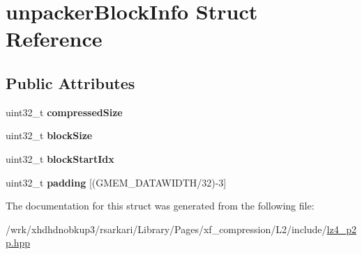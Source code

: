 \hypertarget{structunpackerBlockInfo}{\section{unpacker\-Block\-Info Struct Reference}
\label{structunpackerBlockInfo}
}
\subsection*{Public Attributes}
\begin{DoxyCompactItemize}
\item 
\hypertarget{structunpackerBlockInfo_a741d08923eefe7ae2979c3f511af6b57}{uint32\-\_\-t {\bfseries compressed\-Size}}\label{structunpackerBlockInfo_a741d08923eefe7ae2979c3f511af6b57}

\item 
\hypertarget{structunpackerBlockInfo_add12586bec0bc42280a57955c79836fc}{uint32\-\_\-t {\bfseries block\-Size}}\label{structunpackerBlockInfo_add12586bec0bc42280a57955c79836fc}

\item 
\hypertarget{structunpackerBlockInfo_ad1ff9bae24778d0633e2f0e6a47f1546}{uint32\-\_\-t {\bfseries block\-Start\-Idx}}\label{structunpackerBlockInfo_ad1ff9bae24778d0633e2f0e6a47f1546}

\item 
\hypertarget{structunpackerBlockInfo_a8898717738b6d1e46890f71340badd1d}{uint32\-\_\-t {\bfseries padding} \mbox{[}(G\-M\-E\-M\-\_\-\-D\-A\-T\-A\-W\-I\-D\-T\-H/32)-\/3\mbox{]}}\label{structunpackerBlockInfo_a8898717738b6d1e46890f71340badd1d}

\end{DoxyCompactItemize}


The documentation for this struct was generated from the following file\-:\begin{DoxyCompactItemize}
\item 
/wrk/xhdhdnobkup3/rsarkari/\-Library/\-Pages/xf\-\_\-compression/\-L2/include/\hyperlink{lz4__p2p_8hpp}{lz4\-\_\-p2p.\-hpp}\end{DoxyCompactItemize}
